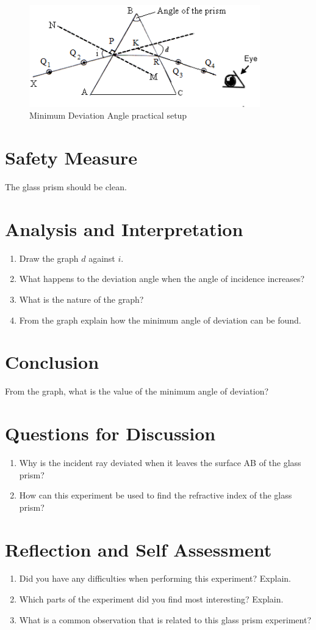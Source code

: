 \begin{figure}[h!]
\centering
\includegraphics[width=10cm]{./img/minimum-deviation-1.png}
\caption{Minimum Deviation Angle practical setup}
\label{fig:minimum-deviation-1}
\end{figure}

\section{Safety Measure}
The glass prism should be clean.

\section{Analysis and Interpretation}
\begin{enumerate}
\item Draw the graph $d$ against $i$.
\item What happens to the deviation angle when the angle of incidence increases?
\item What is the nature of the graph?
\item From the graph explain how the minimum angle of deviation can be found.
\end{enumerate}

\section{Conclusion}
From the graph, what is the value of the minimum angle of deviation?

\section{Questions for Discussion}
\begin{enumerate}
\item Why is the incident ray deviated when it leaves the surface AB of the glass prism?
\item How can this experiment be used to find the refractive index of the glass prism?
\end{enumerate}

\section{Reflection and Self Assessment}
\begin{enumerate}
\item Did you have any difficulties when performing this experiment? Explain.
\item Which parts of the experiment did you find most interesting? Explain.
\item What is a common observation that is related to this glass prism experiment?
\end{enumerate}